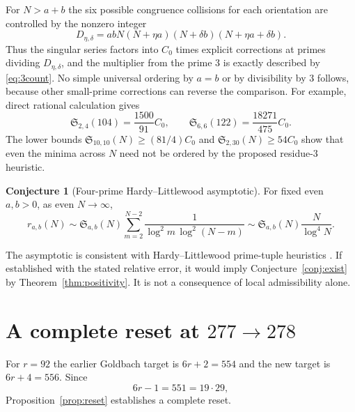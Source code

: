 \documentclass[11pt,a4paper]{article}
\theoremstyle{definition}
\newtheorem{conjecture}[theorem]{Conjecture}
\theoremstyle{remark}
\newcommand{\sg}{\mathfrak S}
\begin{document}
For $N>a+b$ the six possible congruence collisions for each orientation are controlled by the nonzero integer
\begin{equation}\label{eq:Dgen}
 D_{\eta,\delta}=abN(N+\eta a)(N+\delta b)(N+\eta a+\delta b).
\end{equation}
Thus the singular series factors into $C_0$ times explicit corrections at primes dividing $D_{\eta,\delta}$, and the multiplier from the prime 3 is exactly described by \eqref{eq:3count}.  No simple universal ordering by $a=b$ or by divisibility by $3$ follows, because other small-prime corrections can reverse the comparison.  For example, direct rational calculation gives
\begin{equation}
 \sg_{2,4}(104)=\frac{1500}{91}C_0,
 \qquad \sg_{6,6}(122)=\frac{18271}{475}C_0.
\end{equation}
The lower bounds $\sg_{10,10}(N)\ge(81/4)C_0$ and
$\sg_{2,30}(N)\ge54C_0$ show that even the minima across $N$ need not be ordered by the proposed residue-$3$ heuristic.

\begin{conjecture}[Four-prime Hardy--Littlewood asymptotic]\label{conj:HL}
For fixed even $a,b>0$, as even $N\to\infty$,
\begin{equation}\label{eq:HLconj}
 r_{a,b}(N)\sim \sg_{a,b}(N)
 \sum_{m=2}^{N-2}\frac{1}{\log^2m\,\log^2(N-m)}
 \sim \sg_{a,b}(N)\frac{N}{\log^4N}.
\end{equation}
\end{conjecture}
The asymptotic is consistent with Hardy--Littlewood prime-tuple heuristics \citep{HardyLittlewood1923,Gallagher1976,MontgomerySoundararajan2004}.  If established with the stated relative error, it would imply Conjecture~\ref{conj:exist} by Theorem~\ref{thm:positivity}. It is not a consequence of local admissibility alone.

\section{A complete reset at \texorpdfstring{$277\to278$}{277 to 278}}
For $r=92$ the earlier Goldbach target is $6r+2=554$ and the new target is $6r+4=556$. Since
\begin{equation}
 6r-1=551=19\cdot29,
\end{equation}
Proposition~\ref{prop:reset} establishes a complete reset.
\end{document}
